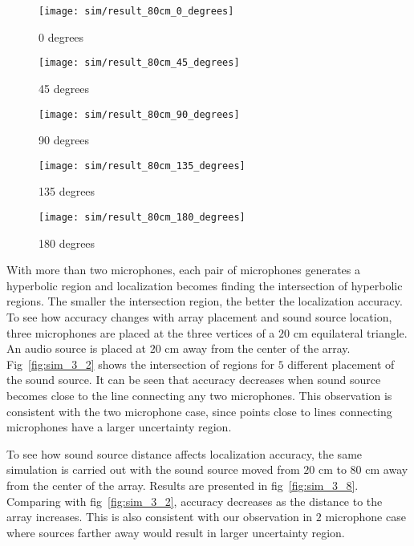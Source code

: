 \begin{figure*}[]
  \centering
  \begin{subfigure}[]{.3\textwidth}
    \texttt{[image: sim/result\_80cm\_0\_degrees]}
    \caption{0 degrees}
  \end{subfigure}
  \begin{subfigure}[]{.3\textwidth}
    \texttt{[image: sim/result\_80cm\_45\_degrees]}
    \caption{45 degrees}
  \end{subfigure}
  \begin{subfigure}[]{.3\textwidth}
    \texttt{[image: sim/result\_80cm\_90\_degrees]}
    \caption{90 degrees}
  \end{subfigure}
  \begin{subfigure}[]{.3\textwidth}
    \texttt{[image: sim/result\_80cm\_135\_degrees]}
    \caption{135 degrees}
  \end{subfigure}
  \begin{subfigure}[]{.3\textwidth}
    \texttt{[image: sim/result\_80cm\_180\_degrees]}
    \caption{180 degrees}
  \end{subfigure}
  \caption{Uncertainty region. Microphones are at the vertices of a $20$cm equilateral triangle. The source is $80$cm away from the array.}
  \label{fig:sim_3_8}
\end{figure*}

With more than two microphones, each pair of microphones generates a hyperbolic region and localization becomes finding the intersection of hyperbolic regions. The smaller the intersection region, the better the localization accuracy. To see how accuracy changes with array placement and sound source location, three microphones are placed at the three vertices of a $20$ cm equilateral triangle. An audio source is placed at $20$ cm away from the center of the array. Fig~\ref{fig:sim_3_2} shows the intersection of regions for $5$ different placement of the sound source. It can be seen that accuracy decreases when sound source becomes close to the line connecting any two microphones. This observation is consistent with the two microphone case, since points close to lines connecting microphones have a larger uncertainty region.

To see how sound source distance affects localization accuracy, the same simulation is carried out with the sound source moved from $20$ cm to $80$ cm away from the center of the array. Results are presented in fig~\ref{fig:sim_3_8}. Comparing with fig~\ref{fig:sim_3_2}, accuracy decreases as the distance to the array increases. This is also consistent with our observation in $2$ microphone case where sources farther away would result in larger uncertainty region.

